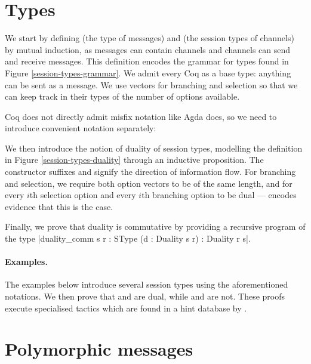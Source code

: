 \documentclass{mproj}
\begin{document}
\section{Types}\label{types}

We start by defining  (the type of messages) and  (the session types of channels) by mutual induction, as messages can contain channels and channels can send and receive messages. This definition encodes the grammar for types found in Figure \ref{session-types-grammar}. We admit every Coq  as a base type: anything can be sent as a message. We use vectors for branching and selection so that we can keep track in their types of the number of options available.


Coq does not directly admit misfix notation like Agda does, so we need to introduce convenient notation separately:


We then introduce the notion of duality of session types, modelling the definition in Figure \ref{session-types-duality} through an inductive proposition. The constructor suffixes  and  signify the direction of information flow. For branching and selection, we require both option vectors to be of the same length, and for every $i$th selection option and every $i$th branching option to be dual ---  encodes evidence that this is the case. 


Finally, we prove that duality is commutative by providing a recursive program of the type \coqe|duality_comm {s r : SType} (d : Duality s r) : Duality r s|.

\paragraph{Examples.}
The examples below introduce several session types using the aforementioned notations. We then prove that  and  are dual, while  and  are not. These proofs execute specialised tactics which are found in a hint database by .


\section{Polymorphic messages}\label{polymorphism}
\end{document}

